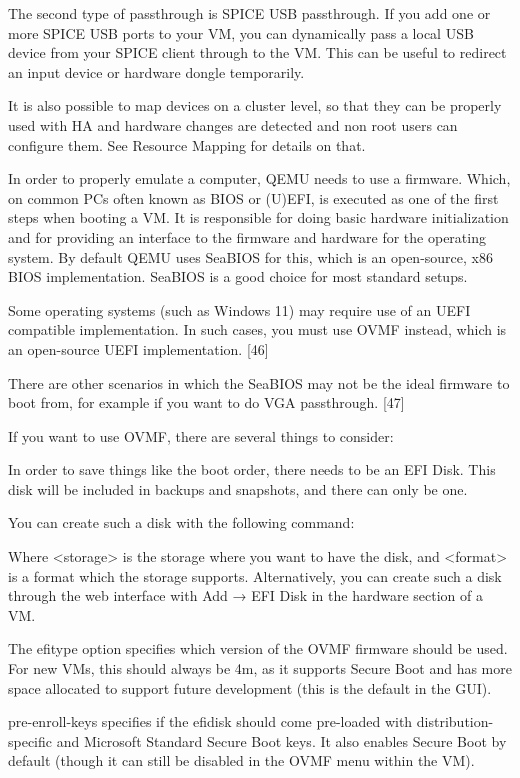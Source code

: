 The second type of passthrough is SPICE USB passthrough. If you add one or more SPICE USB ports to your VM, you can dynamically pass a local USB device from your SPICE client through to the VM. This can be useful to redirect an input device or hardware dongle temporarily.

It is also possible to map devices on a cluster level, so that they can be properly used with HA and hardware changes are detected and non root users can configure them. See Resource Mapping for details on that.

In order to properly emulate a computer, QEMU needs to use a firmware. Which, on common PCs often known as BIOS or (U)EFI, is executed as one of the first steps when booting a VM. It is responsible for doing basic hardware initialization and for providing an interface to the firmware and hardware for the operating system. By default QEMU uses SeaBIOS for this, which is an open-source, x86 BIOS implementation. SeaBIOS is a good choice for most standard setups.

Some operating systems (such as Windows 11) may require use of an UEFI compatible implementation. In such cases, you must use OVMF instead, which is an open-source UEFI implementation. [46]

There are other scenarios in which the SeaBIOS may not be the ideal firmware to boot from, for example if you want to do VGA passthrough. [47]

If you want to use OVMF, there are several things to consider:

In order to save things like the boot order, there needs to be an EFI Disk. This disk will be included in backups and snapshots, and there can only be one.

You can create such a disk with the following command:

Where <storage> is the storage where you want to have the disk, and <format> is a format which the storage supports. Alternatively, you can create such a disk through the web interface with Add → EFI Disk in the hardware section of a VM.

The efitype option specifies which version of the OVMF firmware should be used. For new VMs, this should always be 4m, as it supports Secure Boot and has more space allocated to support future development (this is the default in the GUI).

pre-enroll-keys specifies if the efidisk should come pre-loaded with distribution-specific and Microsoft Standard Secure Boot keys. It also enables Secure Boot by default (though it can still be disabled in the OVMF menu within the VM).

